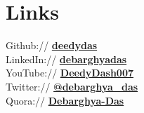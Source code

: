 \section{Links} 
\sectionspacehalf

Github:// \href{https://github.com/deedydas}{\bf deedydas} \\
LinkedIn:// \href{https://www.linkedin.com/in/debarghyadas}{\bf debarghyadas} \\
YouTube:// \href{https://www.youtube.com/user/DeedyDash007}{\bf DeedyDash007} \\
Twitter:// \href{https://twitter.com/debarghya_das}{\bf @debarghya\_das} \\
Quora:// \href{https://www.quora.com/Debarghya-Das}{\bf Debarghya-Das}

\sectionspacehalf
